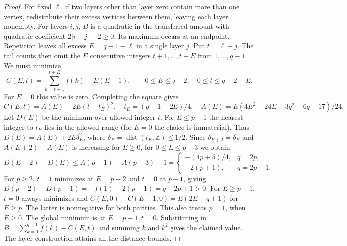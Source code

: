 \documentclass[11pt,a4paper]{article}
\begin{document}
\begin{proof}
For fixed $\ell$, if two layers other than layer zero contain more
than one vertex, redistribute their excess vertices between them,
leaving each layer nonempty. For layers $i,j$, $B$ is a quadratic
in the transferred amount with quadratic coefficient $2|i-j|-2\ge0$.
Its maximum occurs at an endpoint. Repetition leaves all excess
$E=q-1-\ell$ in a single layer $j$. Put $t=\ell-j$. The tail counts
then omit the $E$ consecutive integers $t+1,\ldots,t+E$ from
$1,\ldots,q-1$. We must minimize
\[
 C(E,t)=\sum_{k=t+1}^{t+E} f(k)+E(E+1),\qquad
 0\le E\le q-2,\quad 0\le t\le q-2-E.
\]
For $E=0$ this value is zero. Completing the square gives
\[
 C(E,t)=A(E)+2E(t-t_E)^2,\quad
 t_E=(q-1-2E)/4,\quad
 A(E)=E(4E^2+24E-3q^2-6q+17)/24.
\]
Let $D(E)$ be the minimum over allowed integer $t$. For $E\le p-1$
the nearest integer to $t_E$ lies in the allowed range (for $E=0$
the choice is immaterial). Thus $D(E)=A(E)+2E\delta_E^2$,
where $\delta_E=\operatorname{dist}(t_E,\mathbb Z)\le1/2$.
Since $\delta_{E+2}=\delta_E$ and $A(E+2)-A(E)$ is increasing for
$E\ge0$, for $0\le E\le p-3$ we obtain
\[
 D(E+2)-D(E)\le A(p-1)-A(p-3)+1
 =\begin{cases}-(4p+5)/4,&q=2p,\\-2(p+1),&q=2p+1.\end{cases}
\]
For $p\ge2$, $t=1$ minimizes at $E=p-2$ and $t=0$ at $p-1$, giving
$D(p-2)-D(p-1)=-f(1)-2(p-1)=q-2p+1>0$.
For $E\ge p-1$, $t=0$ always minimizes and
$C(E,0)-C(E-1,0)=E(2E-q+1)$ for $E\ge p$. The latter is
nonnegative for both parities. This also treats $p=1$, when $E\ge0$.
The global minimum is at $E=p-1,t=0$. Substituting in
$B=\sum_{k=1}^{q-1}f(k)-C(E,t)$ and summing $k$ and $k^2$ gives the
claimed value. The layer construction attains all the distance bounds.
\end{proof}
\end{document}
